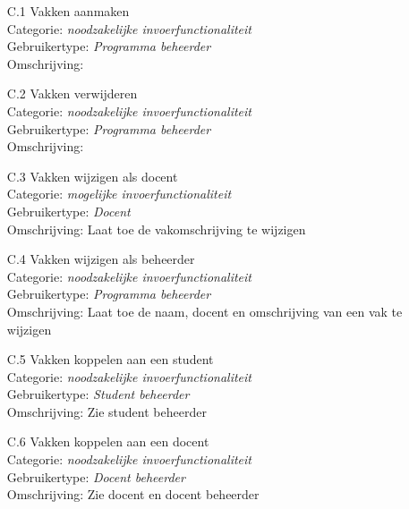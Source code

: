 \documentclass{article}
\begin{document}
\begin{itemize}
\item[C.1] Vakken aanmaken \\
Categorie: \textit{noodzakelijke invoerfunctionaliteit} \\
Gebruikertype: \textit{Programma beheerder }\\
Omschrijving: \\[-3mm]

\item[C.2] Vakken verwijderen \\
Categorie: \textit{noodzakelijke invoerfunctionaliteit} \\
Gebruikertype: \textit{Programma beheerder} \\
Omschrijving: \\[-3mm]

\item[C.3] Vakken wijzigen als docent \\
Categorie: \textit{mogelijke invoerfunctionaliteit} \\
Gebruikertype: \textit{Docent} \\
Omschrijving: Laat toe de vakomschrijving te wijzigen \\[-3mm]

\item[C.4] Vakken wijzigen als beheerder \\
Categorie: \textit{noodzakelijke invoerfunctionaliteit} \\
Gebruikertype: \textit{Programma beheerder }\\
Omschrijving: Laat toe de naam, docent en omschrijving van een vak te wijzigen  \\[-3mm]

\item[C.5] Vakken koppelen aan een student \\
Categorie: \textit{noodzakelijke invoerfunctionaliteit} \\
Gebruikertype: \textit{Student beheerder} \\
Omschrijving: Zie student beheerder \\[-3mm]

\item[C.6] Vakken koppelen aan een docent \\
Categorie: \textit{noodzakelijke invoerfunctionaliteit} \\
Gebruikertype: \textit{Docent beheerder} \\
Omschrijving: Zie docent en docent beheerder \\[-3mm]


\end{itemize}
\end{document}
